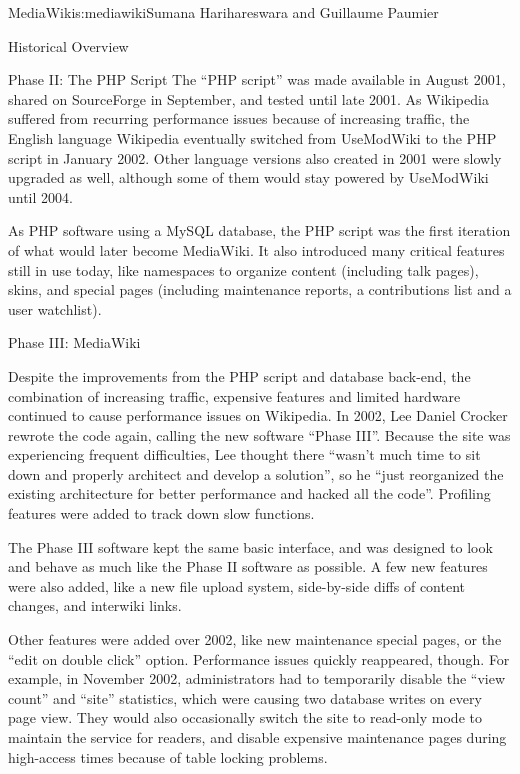 \begin{aosachapter}{MediaWiki}{s:mediawiki}{Sumana Harihareswara and Guillaume Paumier}
\begin{aosasect1}{Historical Overview}
\begin{aosasect2}{Phase II: The PHP Script}
The ``PHP script'' was made available in August 2001, shared on
SourceForge in September, and tested until late 2001. As Wikipedia
suffered from recurring performance issues because of increasing
traffic, the English language Wikipedia eventually switched from
UseModWiki to the PHP script in January 2002. Other language versions
also created in 2001 were slowly upgraded as well, although some of
them would stay powered by UseModWiki until 2004.

As PHP software using a MySQL database, the PHP script was the first
iteration of what would later become MediaWiki. It also introduced
many critical features still in use today, like namespaces to organize
content (including talk pages), skins, and special pages (including
maintenance reports, a contributions list and a user watchlist).

\end{aosasect2}

\begin{aosasect2}{Phase III: MediaWiki}

Despite the improvements from the PHP script and database back-end,
the combination of increasing traffic, expensive features and limited
hardware continued to cause performance issues on Wikipedia. In 2002,
Lee Daniel Crocker rewrote the code again, calling the new software
``Phase III''. Because the site was experiencing frequent difficulties,
Lee thought there ``wasn't much time to sit down and properly architect
and develop a solution'', so he ``just reorganized the existing
architecture for better performance and hacked all the
code''. Profiling features were added to track down slow functions.

The Phase III software kept the same basic interface, and was designed
to look and behave as much like the Phase II software as possible. A
few new features were also added, like a new file upload system,
side-by-side diffs of content changes, and interwiki links.

Other features were added over 2002, like new maintenance special
pages, or the ``edit on double click'' option. Performance issues
quickly reappeared, though. For example, in November 2002,
administrators had to temporarily disable the ``view count'' and ``site''
statistics, which were causing two database writes on every page
view. They would also occasionally switch the site to read-only mode
to maintain the service for readers, and disable expensive maintenance
pages during high-access times because of table locking problems.


\end{aosasect2}
\end{aosasect1}
\end{aosachapter}
